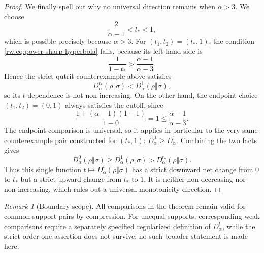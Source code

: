 \documentclass[11pt]{article}
\theoremstyle{remark}
\newtheorem{remark}[remark]{Remark}
\newcommand{\1}{\mathbbm{1}}
\begin{document}
\begin{proof}
We finally spell out why no universal direction remains when
$\alpha>3$.  We choose
\begin{equation*}
 \frac{2}{\alpha-1}<t_*<1,
\end{equation*}
which is possible precisely because $\alpha>3$.  For
$(t_1,t_2)=(t_*,1)$, the condition
\eqref{rw:eq:power-sharp-hyperbola} fails, because its left-hand side is
\begin{equation*}
 \frac{1}{1-t_*}>\frac{\alpha-1}{\alpha-3}.
\end{equation*}
Hence the strict qutrit counterexample above satisfies
\begin{equation*}
 D_\alpha^{t_*}(\rho\Vert\sigma)
 <D_\alpha^1(\rho\Vert\sigma),
\end{equation*}
so its $t$-dependence is not non-increasing.  On the other hand, the
endpoint choice $(t_1,t_2)=(0,1)$ always satisfies the cutoff, since
\begin{equation*}
 \frac{1+(\alpha-1)(1-1)}{1-0}=1
 \leq\frac{\alpha-1}{\alpha-3}.
\end{equation*}
The endpoint comparison is universal, so it applies in particular to
the very same counterexample pair constructed for $(t_*,1)$:
$D_\alpha^0\geq D_\alpha^1$.  Combining the two facts gives
\begin{equation*}
 D_\alpha^0(\rho\Vert\sigma)
 \geq D_\alpha^1(\rho\Vert\sigma)
 >D_\alpha^{t_*}(\rho\Vert\sigma).
\end{equation*}
Thus this single function $t\mapsto D_\alpha^t(\rho\Vert\sigma)$
has a strict downward net change from $0$ to $t_*$ but a strict upward
change from $t_*$ to $1$.
It is neither non-decreasing nor non-increasing, which rules out a
universal monotonicity direction.
\end{proof}

\begin{remark}[Boundary scope]
All comparisons in the theorem remain valid for common-support pairs
by compression.  For unequal supports, corresponding weak
comparisons require a separately specified regularized definition of
$D_\alpha^t$, while the strict order-one assertion does not survive;
no such broader statement is made here.
\end{remark}
\end{document}
